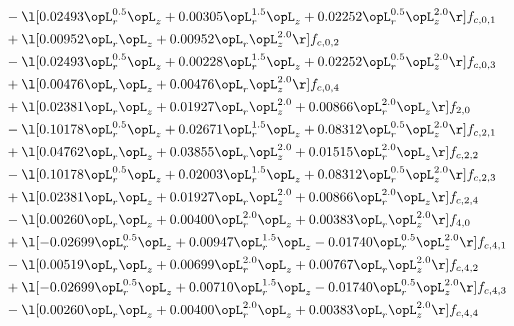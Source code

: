 \begin{alignat}{2}
& - \l[  0.02493 \opL_r^{0.5} \opL_z +  0.00305 \opL_r^{1.5} \opL_z +  0.02252 \opL_r^{0.5} \opL_z^{2.0}  \r] f_{c,0,1} \nonumber \\ 
& + \l[  0.00952 \opL_r \opL_z +  0.00952 \opL_r \opL_z^{2.0}  \r] f_{c,0,2} \nonumber \\ 
& - \l[  0.02493 \opL_r^{0.5} \opL_z +  0.00228 \opL_r^{1.5} \opL_z +  0.02252 \opL_r^{0.5} \opL_z^{2.0}  \r] f_{c,0,3} \nonumber \\ 
& + \l[  0.00476 \opL_r \opL_z +  0.00476 \opL_r \opL_z^{2.0}  \r] f_{c,0,4} \nonumber \\ 
& + \l[  0.02381 \opL_r \opL_z +  0.01927 \opL_r \opL_z^{2.0} +  0.00866 \opL_r^{2.0} \opL_z  \r] f_{2,0} \nonumber \\ 
& - \l[  0.10178 \opL_r^{0.5} \opL_z +  0.02671 \opL_r^{1.5} \opL_z +  0.08312 \opL_r^{0.5} \opL_z^{2.0}  \r] f_{c,2,1} \nonumber \\ 
& + \l[  0.04762 \opL_r \opL_z +  0.03855 \opL_r \opL_z^{2.0} +  0.01515 \opL_r^{2.0} \opL_z  \r] f_{c,2,2} \nonumber \\ 
& - \l[  0.10178 \opL_r^{0.5} \opL_z +  0.02003 \opL_r^{1.5} \opL_z +  0.08312 \opL_r^{0.5} \opL_z^{2.0}  \r] f_{c,2,3} \nonumber \\ 
& + \l[  0.02381 \opL_r \opL_z +  0.01927 \opL_r \opL_z^{2.0} +  0.00866 \opL_r^{2.0} \opL_z  \r] f_{c,2,4} \nonumber \\ 
& - \l[  0.00260 \opL_r \opL_z +  0.00400 \opL_r^{2.0} \opL_z +  0.00383 \opL_r \opL_z^{2.0}  \r] f_{4,0} \nonumber \\ 
& + \l[  -0.02699 \opL_r^{0.5} \opL_z +  0.00947 \opL_r^{1.5} \opL_z   -0.01740 \opL_r^{0.5} \opL_z^{2.0}  \r] f_{c,4,1} \nonumber \\ 
& - \l[  0.00519 \opL_r \opL_z +  0.00699 \opL_r^{2.0} \opL_z +  0.00767 \opL_r \opL_z^{2.0}  \r] f_{c,4,2} \nonumber \\ 
& + \l[  -0.02699 \opL_r^{0.5} \opL_z +  0.00710 \opL_r^{1.5} \opL_z   -0.01740 \opL_r^{0.5} \opL_z^{2.0}  \r] f_{c,4,3} \nonumber \\ 
& - \l[  0.00260 \opL_r \opL_z +  0.00400 \opL_r^{2.0} \opL_z +  0.00383 \opL_r \opL_z^{2.0}  \r] f_{c,4,4} \nonumber \\ 
\end{alignat} 


